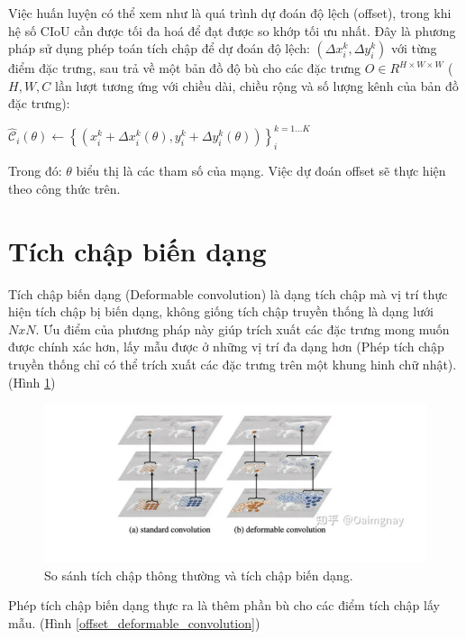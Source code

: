 \documentclass[12pt,a4paper,openany,oneside]{report}
\begin{document}
Việc huấn luyện có thể xem như là quá trình dự đoán độ lệch (offset), trong khi hệ số CIoU cần được tối đa hoá để đạt được so khớp tối ưu nhất. Đây là phương pháp sử dụng phép toán tích chập để dự đoán độ lệch:
$\left(\Delta x_i^k, \Delta y_i^k\right)$
với từng điểm đặc trưng, sau trả về một bản đồ độ bù cho các đặc trưng
$O \in R^{H \times W \times W}$ ($H, W, C$ lần lượt tương ứng với chiều dài, chiều rộng và số lượng kênh của bản đồ đặc trưng):
\begin{center}
	$\hat{\mathcal{C}}_i(\theta) \leftarrow\left\{\left(x_i^k+\Delta x_i^k(\theta), y_i^k+\Delta y_i^k(\theta)\right)\right\}_i^{k=1 \ldots K}$
\end{center}

Trong đó: $\theta$ biểu thị là các tham số của mạng. Việc dự đoán offset sẽ thực hiện theo công thức trên.

\section{Tích chập biến dạng}
Tích chập biến dạng (Deformable convolution) là dạng tích chập mà vị trí thực hiện tích chập bị biến dạng, không giống tích chập truyền thống là dạng lưới $NxN$. Ưu điểm của phương pháp này giúp trích xuất các đặc trưng mong muốn được chính xác hơn, lấy mẫu được ở những vị trí đa dạng hơn (Phép tích chập truyền thống chỉ có thể trích xuất các đặc trưng trên một khung hinh chữ nhật).(Hình \ref{so_sanh_tich_chap_thong_thuong_deformable})

\begin{figure}[ht!]
	\begin{center}
		\includegraphics[width=445px]{./compare_normal_with_deformable_convolution.jpg}
		\caption{So sánh tích chập thông thường và tích chập biến dạng.}
		\label{so_sanh_tich_chap_thong_thuong_deformable}
	\end{center}
\end{figure} 

Phép tích chập biến dạng thực ra là thêm phần bù cho các điểm tích chập lấy mẫu. (Hình \ref{offset_deformable_convolution})
\end{document}
